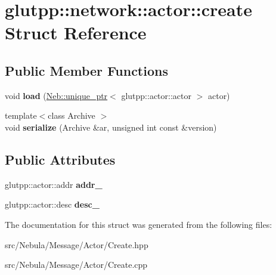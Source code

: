 \hypertarget{structglutpp_1_1network_1_1actor_1_1create}{\section{glutpp\-:\-:network\-:\-:actor\-:\-:create \-Struct \-Reference}
\label{structglutpp_1_1network_1_1actor_1_1create}
}
\subsection*{\-Public \-Member \-Functions}
\begin{DoxyCompactItemize}
\item 
\hypertarget{structglutpp_1_1network_1_1actor_1_1create_accc621699dd1fd80af572dda0caf64cf}{void {\bfseries load} (\hyperlink{classNeb_1_1unique__ptr}{\-Neb\-::unique\-\_\-ptr}$<$ glutpp\-::actor\-::actor $>$ actor)}\label{structglutpp_1_1network_1_1actor_1_1create_accc621699dd1fd80af572dda0caf64cf}

\item 
\hypertarget{structglutpp_1_1network_1_1actor_1_1create_aad9dd37d1bfd140b16db4576e2e0cf95}{{\footnotesize template$<$class Archive $>$ }\\void {\bfseries serialize} (\-Archive \&ar, unsigned int const \&version)}\label{structglutpp_1_1network_1_1actor_1_1create_aad9dd37d1bfd140b16db4576e2e0cf95}

\end{DoxyCompactItemize}
\subsection*{\-Public \-Attributes}
\begin{DoxyCompactItemize}
\item 
\hypertarget{structglutpp_1_1network_1_1actor_1_1create_ad7ae6922af0930010bd0c78073c7745c}{glutpp\-::actor\-::addr {\bfseries addr\-\_\-}}\label{structglutpp_1_1network_1_1actor_1_1create_ad7ae6922af0930010bd0c78073c7745c}

\item 
\hypertarget{structglutpp_1_1network_1_1actor_1_1create_ae55eea93cbd958365387635335596945}{glutpp\-::actor\-::desc {\bfseries desc\-\_\-}}\label{structglutpp_1_1network_1_1actor_1_1create_ae55eea93cbd958365387635335596945}

\end{DoxyCompactItemize}


\-The documentation for this struct was generated from the following files\-:\begin{DoxyCompactItemize}
\item 
src/\-Nebula/\-Message/\-Actor/\-Create.\-hpp\item 
src/\-Nebula/\-Message/\-Actor/\-Create.\-cpp\end{DoxyCompactItemize}
